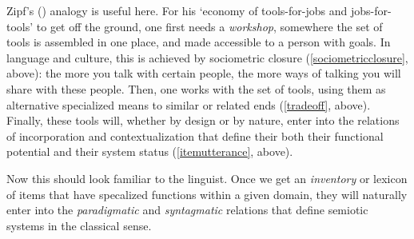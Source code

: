 Zipf's (\citeyear{zipf_human_1949}) analogy is useful here. For his \textquoteleft economy of tools-for-jobs 
and jobs-for-tools' to get off the ground, one first needs a \textit{workshop}, somewhere the set of tools is assembled in one place, 
and made accessible to a person with goals. In language and 
culture, this is achieved by sociometric closure (\ref{sociometricclosure}, above): the more you talk with certain people, the more ways of talking you will share with these people. 
Then, one works with the set of tools, using them as alternative specialized means to similar or related ends (\ref{tradeoff}, above). Finally, these tools will, whether 
by design or by nature, enter into the relations of incorporation and 
contextualization that define their both their functional potential and their system status (\ref{itemutterance}, 
above). 



Now this should look familiar to the linguist. Once we get an \textit{inventory} or lexicon of items that have specalized functions within a given domain, they will naturally enter into the 
\textit{paradigmatic} and \textit{syntagmatic} relations that 
define semiotic systems in the classical sense.









\newpage